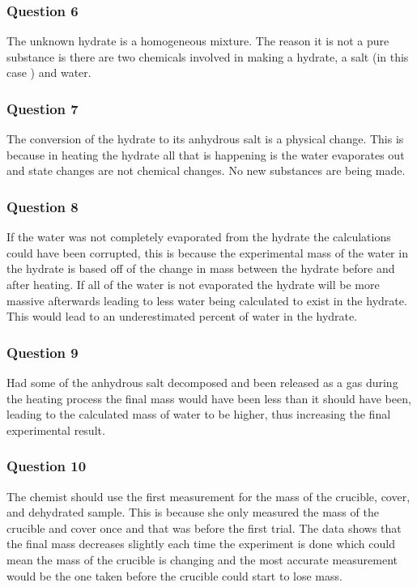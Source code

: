 \documentclass[12pt]{article}
\begin{document}
\subsubsection{Question 6}
The unknown hydrate is a homogeneous mixture. The reason it is not a pure substance is there are two chemicals involved in making a hydrate, a salt (in this case ) and water.

\subsubsection{Question 7}
The conversion of the hydrate to its anhydrous salt is a physical change. This is because in heating the hydrate all that is happening is the water evaporates out and state changes are not chemical changes. No new substances are being made.

\subsubsection{Question 8}
If the water was not completely evaporated from the hydrate the calculations could have been corrupted, this is because the experimental mass of the water in the hydrate is based off of the change in mass between the hydrate before and after heating. If all of the water is not evaporated the hydrate will be more massive afterwards leading to less water being calculated to exist in the hydrate. This would lead to an underestimated percent of water in the hydrate.

\subsubsection{Question 9}
Had some of the anhydrous salt decomposed and been released as a gas during the heating process the final mass would have been less than it should have been, leading to the calculated mass of water to be higher, thus increasing the final experimental result.

\subsubsection{Question 10}
The chemist should use the first measurement for the mass of the crucible, cover, and dehydrated sample. This is because she only measured the mass of the crucible and cover once and that was before the first trial. The data shows that the final mass decreases slightly each time the experiment is done which could mean the mass of the crucible is changing and the most accurate measurement would be the one taken before the crucible could start to lose mass. 
		\newpage
        \nocite{Burner}
		
        
		
		
\end{document}
